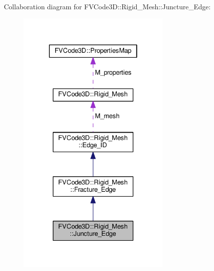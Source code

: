 Collaboration diagram for F\+V\+Code3D\+:\+:Rigid\+\_\+\+Mesh\+:\+:Juncture\+\_\+\+Edge\+:
\nopagebreak
\begin{figure}[H]
\begin{center}
\leavevmode
\includegraphics[width=214pt]{classFVCode3D_1_1Rigid__Mesh_1_1Juncture__Edge__coll__graph}
\end{center}
\end{figure}
